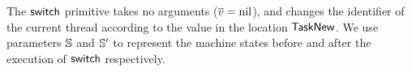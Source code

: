 The $\mathsf{switch}{}$ primitive takes no arguments
($\overline{v} = \text{nil}$), and changes the identifier
of the current thread according to the value
in the location $\mathsf{TaskNew}$. We use parameters $\mathbb{S}$
and $\mathbb{S}'$ to represent the machine states before
and after the execution of $\mathsf{switch}{}$ respectively.

